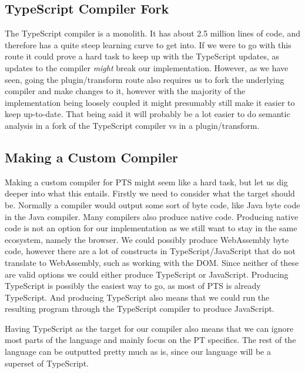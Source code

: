\subsection{TypeScript Compiler Fork}\label{subsec:typescript-compiler-fork}

The TypeScript compiler is a monolith.
It has about 2.5 million lines of code, and therefore has a quite steep learning curve to get into.
If we were to go with this route it could prove a hard task to keep up with the TypeScript updates, as updates to the compiler \textit{might} break our implementation.
However, as we have seen, going the plugin/transform route also requires us to fork the underlying compiler and make changes to it, however with the majority of the implementation being loosely coupled it might presumably still make it easier to keep up-to-date.
That being said it will probably be a lot easier to do semantic analysis in a fork of the TypeScript compiler vs in a plugin/transform.

\subsection{Making a Custom Compiler}\label{subsec:making-a-custom-compiler}


Making a custom compiler for PTS might seem like a hard task, but let us dig deeper into what this entails.
Firstly we need to consider what the target should be.
Normally a compiler would output some sort of byte code, like Java byte code in the Java compiler.
Many compilers also produce native code.
Producing native code is not an option for our implementation as we still want to stay in the same ecosystem, namely the browser.
We could possibly produce WebAssembly byte code, however there are a lot of constructs in TypeScript/JavaScript that do not translate to WebAssembly, such as working with the DOM\@.
Since neither of these are valid options we could either produce TypeScript or JavaScript.
Producing TypeScript is possibly the easiest way to go, as most of PTS is already TypeScript.
And producing TypeScript also means that we could run the resulting program through the TypeScript compiler to produce JavaScript.

Having TypeScript as the target for our compiler also means that we can ignore most parts of the language and mainly focus on the PT specifics.
The rest of the language can be outputted pretty much as is, since our language will be a superset of TypeScript.


